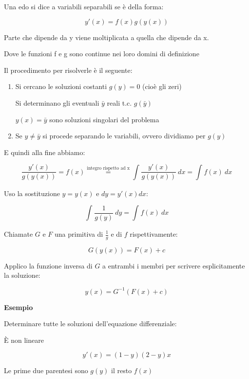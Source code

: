 \documentclass[11pt]{article}
\begin{document}
Una edo si dice a variabili separabili se è della forma:

\[
    y'(x) = f(x) g(y(x))
\]

Parte che dipende da y viene moltiplicata a quella che dipende da x.

Dove le funzioni f e g sono continue nei loro domini di definizione

Il procedimento per risolverle è il seguente:

\begin{enumerate}
    \item Si cercano le soluzioni costanti $g(y)=0$ (cioè gli zeri)

        Si determinano gli eventuali $\bar y$ reali t.c. $g(\bar y)$

        $y(x)= \bar y$ sono soluzioni singolari del problema 
        
    \item Se $y \neq \bar y$ si procede separando le variabili, ovvero dividiamo per $g(y)$
\end{enumerate}

E quindi alla fine abbiamo:

\[
    \frac{y'(x)}{g(y(x))} = f(x) \overset{\text{integro rispetto ad x}}{=} \int_{{}}^{{}} {\frac{y'(x)}{g(y(x))} } \: d{x} {} = \int_{{}}^{{}} {f(x)} \: d{x} {}
\]

Uso la sostituzione $y = y(x)$ e $dy = y'(x) dx$:

\[
    \int_{{}}^{{}} {\frac{1}{g(y)} } \: d{y} = {\int_{{}}^{{}} {f(x)} \: d{x} {}}
\]

Chiamate $G$ e $F$ una primitiva di $\frac{1}{g} $ e di $f$ rispettivamente:

\[
    G(y(x)) = F(x) + c
\]

Applico la funzione inversa di $G$ a entrambi i membri per scrivere esplicitamente la soluzione:

\[
    y(x) = G ^{-1} (F(x) + c)
\]

\textbf{Esempio}

Determinare tutte le soluzioni dell'equazione differenziale:

È non lineare

\[
    y'(x) = (1-y)(2-y)x
\]

Le prime due parentesi sono $g(y)$ il resto $f(x)$
\end{document}
